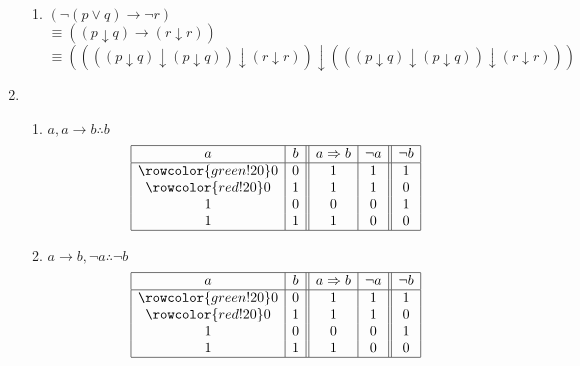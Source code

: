 \documentclass{article}
\begin{document}
\begin{enumerate}[label=(\alph*)]
\begin{enumerate}[label=\roman*.]
        \item 
        \quad $(\neg{}(p\lor{}q)\rightarrow{}\neg{}r)$ \\
        \quad $\equiv{} ((p\downarrow{}q)\rightarrow{}(r\downarrow{}r))$ \\
        \quad $\equiv{} ((((p\downarrow{}q)\downarrow{}(p\downarrow{}q))\downarrow{}(r\downarrow{}r))\downarrow{}(((p\downarrow{}q)\downarrow{}(p\downarrow{}q))\downarrow{}(r\downarrow{}r)))$ \\
    \end{enumerate}
    
    \item 
    \begin{enumerate}[label=\roman*.]
        \item 
        $a,a\rightarrow{}b\therefore{}b$
        \begin{displaymath}
            \begin{array}{|c|c||c|c||c|}
            \hline
               a
             & b
             & a\Rightarrow{}b
             & \lnot{}a
             & \lnot{}b \\
            \hline
            \rowcolor{green!20}
            0 & 0 & 1 & 1 & 1 \\
            \rowcolor{red!20}
            0 & 1 & 1 & 1 & 0 \\
            1 & 0 & 0 & 0 & 1 \\
            1 & 1 & 1 & 0 & 0 \\
            \hline
            \end{array}
        \end{displaymath}
    
        \item 
        $a\rightarrow{}b,\neg{}a\therefore{}\neg{}b$
        \begin{displaymath}
            \begin{array}{|c|c||c|c||c|}
            \hline
               a
             & b
             & a\Rightarrow{}b
             & \lnot{}a
             & \lnot{}b \\
            \hline
            \rowcolor{green!20}
            0 & 0 & 1 & 1 & 1 \\
            \rowcolor{red!20}
            0 & 1 & 1 & 1 & 0 \\
            1 & 0 & 0 & 0 & 1 \\
            1 & 1 & 1 & 0 & 0 \\
            \hline
            \end{array}
        \end{displaymath}
    

\end{enumerate}
\end{enumerate}
\end{document}

